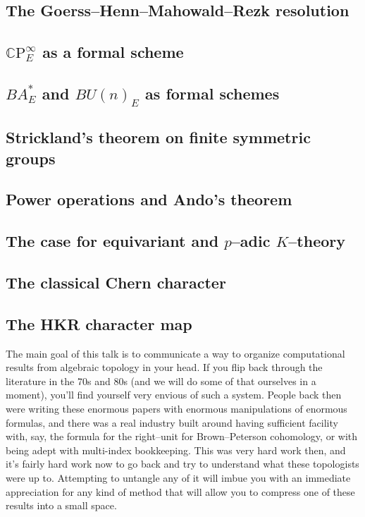     \subsection*{The Goerss--Henn--Mahowald--Rezk resolution}

    \subsection*{$\mathbb C \mathrm P^\infty_E$ as a formal scheme}
    \subsection*{$BA^*_E$ and $BU(n)_E$ as formal schemes}
    \subsection*{Strickland's theorem on finite symmetric groups}
    \subsection*{Power operations and Ando's theorem}

    \subsection*{The case for equivariant and $p$--adic $K$--theory}
    \subsection*{The classical Chern character}
    \subsection*{The HKR character map}


\newpage


The main goal of this talk is to communicate a way to organize computational results from algebraic topology in your head.  If you flip back through the literature in the 70s and 80s (and we will do some of that ourselves in a moment), you'll find yourself very envious of such a system.  People back then were writing these enormous papers with enormous manipulations of enormous formulas, and there was a real industry built around having sufficient facility with, say, the formula for the right--unit for Brown--Peterson cohomology, or with being adept with multi-index bookkeeping.  This was very hard work then, and it's fairly hard work now to go back and try to understand what these topologists were up to.  Attempting to untangle any of it will imbue you with an immediate appreciation for any kind of method that will allow you to compress one of these results into a small space.

